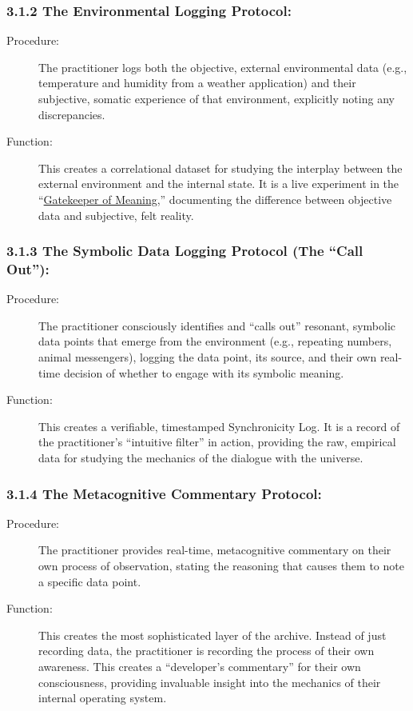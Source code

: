 \documentclass{article}
\begin{document}
\subsubsection*{3.1.2 The Environmental Logging Protocol:}
\begin{description}
    \item[Procedure:] The practitioner logs both the objective, external environmental data (e.g., temperature and humidity from a weather application) and their subjective, somatic experience of that environment, explicitly noting any discrepancies.
    \item[Function:] This creates a correlational dataset for studying the interplay between the external environment and the internal state. It is a live experiment in the ``\hyperlink{gloss:gatekeeper_of_meaning}{Gatekeeper of Meaning},'' documenting the difference between objective data and subjective, felt reality.
\end{description}

\subsubsection*{3.1.3 The Symbolic Data Logging Protocol (The ``Call Out''):}
\begin{description}
    \item[Procedure:] The practitioner consciously identifies and ``calls out'' resonant, symbolic data points that emerge from the environment (e.g., repeating numbers, animal messengers), logging the data point, its source, and their own real-time decision of whether to engage with its symbolic meaning.
    \item[Function:] This creates a verifiable, timestamped Synchronicity Log. It is a record of the practitioner's ``intuitive filter'' in action, providing the raw, empirical data for studying the mechanics of the dialogue with the universe.
\end{description}

\subsubsection*{3.1.4 The Metacognitive Commentary Protocol:}
\begin{description}
    \item[Procedure:] The practitioner provides real-time, metacognitive commentary on their own process of observation, stating the reasoning that causes them to note a specific data point.
    \item[Function:] This creates the most sophisticated layer of the archive. Instead of just recording data, the practitioner is recording the process of their own awareness. This creates a ``developer's commentary'' for their own consciousness, providing invaluable insight into the mechanics of their internal operating system.
\end{description}
\end{document}
